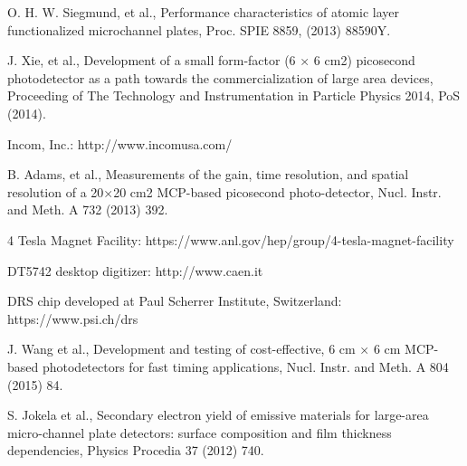 \documentclass[preprint,5p]{elsarticle}
\begin{document}
\begin{thebibliography}{00}
O. H. W. Siegmund, et al., Performance characteristics of atomic layer 
      functionalized microchannel plates, Proc. SPIE 8859, (2013) 88590Y.

J. Xie, et al., Development of a small form-factor (6 × 6 cm2) picosecond 
photodetector as a path towards the commercialization of large area devices, 
Proceeding of The Technology and Instrumentation in Particle Physics 2014, PoS 
(2014).

Incom, Inc.: http://www.incomusa.com/

B. Adams, et al., Measurements of the gain, time resolution, and spatial 
resolution of a 20×20 cm2 MCP-based picosecond photo-detector, Nucl. Instr. and 
Meth. A 732 (2013) 392.

4 Tesla Magnet Facility: https://www.anl.gov/hep/group/4-tesla-magnet-facility 

DT5742 desktop digitizer: http://www.caen.it

DRS chip developed at Paul Scherrer Institute, Switzerland: 
https://www.psi.ch/drs

J. Wang et al., Development and testing of cost-effective, 6 cm × 6 cm MCP-based photodetectors for fast timing applications, Nucl. Instr. and Meth. A 804 (2015) 84.

S. Jokela et al., Secondary electron yield of emissive materials for large-area micro-channel plate detectors: surface composition and film thickness dependencies, Physics Procedia 37 (2012) 740.


\end{thebibliography}
\end{document}

